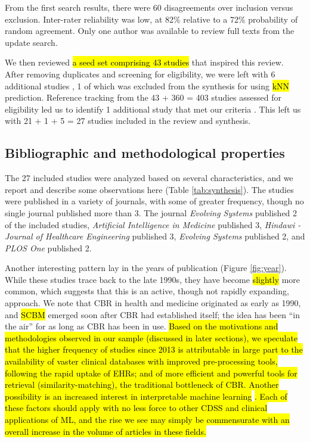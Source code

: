 \documentclass[sn-mathphys,Numbered,pdflatex]{sn-jnl}
\theoremstyle{remark}
\theoremstyle{definition}
\begin{document}
From the first search results, there were 60 disagreements over
inclusion versus exclusion. Inter-rater reliability was low, at 82\%
relative to a 72\% probability of random agreement. Only one author was
available to review full texts from the update search.

We then reviewed \hl{a seed set comprising 43 studies} that inspired
this review. After removing duplicates and screening for eligibility, we
were left with 6 additional studies
\citep{Park2006, Lowsky2013, Lee2015, Ng2015, Lee2017, Wang2019}, 1 of
which was excluded from the synthesis for using \hl{kNN} prediction. Reference
tracking from the 43 + 360 = 403 studies assessed for eligibility led us
to identify 1 additional study that met our criteria
\citep{Kasabov2010}. This left us with 21 + 1 + 5 = 27 studies included
in the review and synthesis.

\subsection{Bibliographic and methodological
properties}\label{bibliographic-and-methodological-properties}

The 27 included studies were analyzed based on several characteristics,
and we report and describe some observations here (Table
\ref{tab:synthesis}). The studies were published in a variety of
journals, with some of greater frequency, though no single journal
published more than 3. The journal \emph{Evolving Systems} published 2
of the included studies, \emph{Artificial Intelligence in Medicine}
published 3, \emph{Hindawi - Journal of Healthcare Engineering}
published 3, \emph{Evolving Systems} published 2, and \emph{PLOS One}
published 2.

Another interesting pattern lay in the years of publication (Figure
\ref{fig:year}). While these studies trace back to the late 1990s, they
have become \hl{slightly }more common, which suggests that this is an
active, though not rapidly expanding, approach. We note that CBR in
health and medicine originated as early as 1990, and \hl{SCBM} emerged
soon after CBR had established itself; the idea has been ``in the air''
for as long as CBR has been in use.\hl{ Based on the motivations and methodologies observed in our sample (discussed in later sections), we speculate that the higher frequency of studies since 2013 is attributable in large part to the availability of vaster clinical databases with improved pre-processing tools, following the rapid uptake of EHRs; and of more efficient and powerful tools for retrieval (similarity-matching), the traditional bottleneck of CBR. Another possibility is an increased interest in interpretable machine learning }\citep{Rudin2022}\hl{. Each of these factors should apply with no less force to other CDSS and clinical applications of ML, and the rise we see may simply be commensurate with an overall increase in the volume of articles in these fields.}
\end{document}
